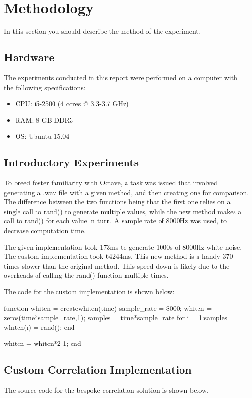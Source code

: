 \section{Methodology}
In this section you should describe the method of the experiment.



\subsection{Hardware}
The experiments conducted in this report were performed on a computer with the following specifications:
\begin{itemize}
	\item CPU: i5-2500 (4 cores @ 3.3-3.7	GHz)
	\item RAM: 8 GB DDR3
	\item OS:  Ubuntu 15.04
\end{itemize}

\subsection{Introductory Experiments}
To breed foster familiarity with Octave, a task was issued that involved generating a .wav file with a given method, and then creating one for comparison. The difference between the two functions being that the first one relies on a single call to rand() to generate multiple values, while the new method makes a call to rand() for each value in turn. A sample rate of 8000Hz was used, to decrease computation time. 

The given implementation took 173ms to generate 1000s of 8000Hz white noise. The custom implementation took 64244ms. This new method is a handy 370 times slower than the original method. This speed-down is likely due to the overheads of calling the rand() function multiple times.

The code for the custom implementation is shown below:

\begin{Matlab}
function whiten = createwhiten(time)
  sample_rate = 8000;
  whiten = zeros(time*sample_rate,1);
  samples = time*sample_rate
  for i = 1:samples
    whiten(i) = rand();
  end
  
  whiten = whiten*2-1; %
end
\end{Matlab}


\subsection{Custom Correlation Implementation}
The source code for the bespoke correlation solution is shown below.

